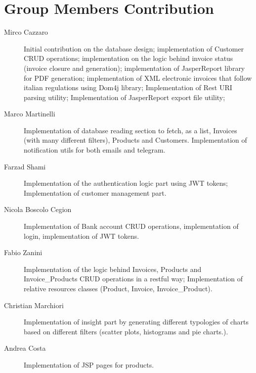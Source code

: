 \section{Group Members Contribution}


\begin{description}
	\item[Mirco Cazzaro] Initial contribution on the database design; implementation of Customer CRUD operations; implementation on the logic behind invoice status (invoice closure and generation); implementation of JasperReport library for PDF generation; implementation of XML electronic invoices that follow italian regulations using Dom4j library; Implementation of Rest URI parsing utility; Implementation of JasperReport export file utility;
	\item[Marco Martinelli] Implementation of database reading section to fetch, as a list, Invoices (with many different filters), Products and Customers. Implementation of notification utils for both emails and telegram. 
	\item[Farzad Shami] Implementation of the authentication logic part using JWT tokens; Implementation of customer management part.
	\item[Nicola Boscolo Cegion] Implementation of Bank account CRUD operations, implementation of login, implementation of JWT tokens.
	\item[Fabio Zanini] Implementation of the logic behind Invoices, Products and Invoice_Products CRUD operations in a restful way; Implementation of relative resources classes (Product, Invoice, Invoice_Product).
	\item[Christian Marchiori] Implementation of insight part by generating different typologies of charts based on different filters (scatter plots, histograms and pie charts.).
	\item[Andrea Costa] Implementation of JSP pages for products. 

\end{description}
